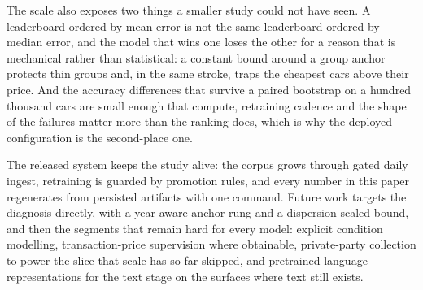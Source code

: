 \documentclass[journal,10pt]{IEEEtran}
\begin{document}
The scale also exposes two things a smaller study could not have seen. A leaderboard ordered by mean error is not the same leaderboard ordered by median error, and the model that wins one loses the other for a reason that is mechanical rather than statistical: a constant bound around a group anchor protects thin groups and, in the same stroke, traps the cheapest cars above their price. And the accuracy differences that survive a paired bootstrap on a hundred thousand cars are small enough that compute, retraining cadence and the shape of the failures matter more than the ranking does, which is why the deployed configuration is the second-place one.

The released system keeps the study alive: the corpus grows through gated daily ingest, retraining is guarded by promotion rules, and every number in this paper regenerates from persisted artifacts with one command. Future work targets the diagnosis directly, with a year-aware anchor rung and a dispersion-scaled bound, and then the segments that remain hard for every model: explicit condition modelling, transaction-price supervision where obtainable, private-party collection to power the slice that scale has so far skipped, and pretrained language representations for the text stage on the surfaces where text still exists.
\end{document}
